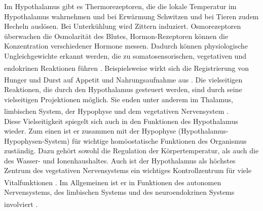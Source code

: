 \noindent Im Hypothalamus gibt es Thermorezeptoren, die die lokale Temperatur im Hypothalamus wahrnehmen und bei Erwärmung Schwitzen und bei Tieren zudem Hecheln auslösen. Bei Unterkühlung wird Zittern induziert. Osmorezeptoren überwachen die Osmolarität des Blutes, Hormon-Rezeptoren können die Konzentration verschiedener Hormone messen. Dadurch können physiologische Ungleichgewichte erkannt werden, die zu somatosensorischen, vegetativen und endokrinen Reaktionen führen \textsuperscript{\cite[Kap.~14]{penzlin2005tierphys}}. Beispielsweise wirkt sich die Registrierung von Hunger und Durst auf Appetit und Nahrungsaufnahme aus \textsuperscript{\cite[Kap.~6]{storch2012lehrbuchzoo}}. Die vielseitigen Reaktionen, die durch den Hypothalamus gesteuert werden, sind durch seine vielseitigen Projektionen möglich. Sie enden unter anderem im Thalamus, limbischen System, der Hypophyse und dem vegetativen Nervensystem \textsuperscript{\cite[Kap.~16]{crossman2014neuroanatomy}}. \\

\noindent Diese Vielseitigkeit spiegelt sich auch in den Funktionen des Hypothalamus wieder. Zum einen ist er zusammen mit der Hypophyse (Hypothalamus-Hypophysen-System) für wichtige homöostatische Funktionen des Organismus zuständig. Dazu gehört sowohl die Regulation der Körpertemperatur, als auch die des Wasser- und Ionenhaushaltes. Auch ist der Hypothalamus als höchstes Zentrum des vegetativen Nervensystems ein wichtiges Kontrollzentrum für viele Vitalfunktionen \textsuperscript{\cite[Kap.~14]{penzlin2005tierphys}}. Im Allgemeinen ist er in Funktionen des autonomen Nervensystems, des limbischen Systems und des neuroendokrinen Systems involviert \textsuperscript{\cite[Kap.~16]{crossman2014neuroanatomy}}.
 
